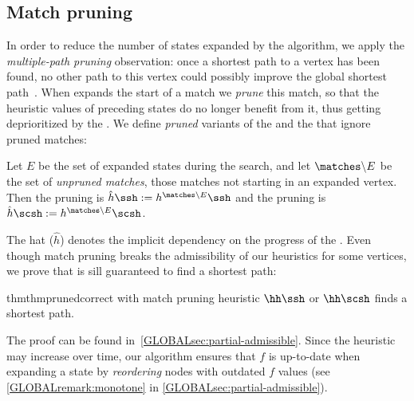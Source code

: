 \subsection{Match pruning} \label{GLOBALsec:match-pruning}

In order to reduce the number of
states expanded by the \A algorithm, we apply the \emph{multiple-path pruning}
observation: once a shortest path to a vertex has been found, no other path to
this vertex could possibly improve the global shortest
path~\citep{poole2017artificial}. When \A expands the start of a
match we
\emph{prune} this match, so that the heuristic values of preceding states do no longer
benefit from it, thus getting deprioritized by the
\A. We define \emph{pruned} variants of the \sh and the \csh that ignore
pruned matches:

\begin{definition}
   Let $E$ be the set of expanded states during the \A search, and let $\matches \backslash
   E$ be the set of \emph{unpruned matches}, \ie those matches not starting in an expanded
   vertex. Then the pruning \sh is $\hat h\ssh := h^{\matches\backslash E}\ssh$ and
   the pruning \csh is ${\hat h\scsh := h^{\matches\backslash E}\scsh}$.
\end{definition}

The hat ($\hat h$) denotes the implicit dependency on the progress of the \A. Even
though match pruning breaks the admissibility of our heuristics for some
vertices, we prove that \A is sill guaranteed to find a shortest path:

\begin{restatable}{thm}{thmprunedcorrect} \label{GLOBALthm:pruned-correct}
   \A with match pruning heuristic $\hh\ssh$ or $\hh\scsh$ finds a shortest path.
\end{restatable}

The proof can be found in~\cref{GLOBALsec:partial-admissible}. Since the heuristic may
increase over time, our algorithm ensures that $f$ is up-to-date when expanding a
state by \emph{reordering} nodes with outdated $f$ values (see \cref{GLOBALremark:monotone} in \cref{GLOBALsec:partial-admissible}).
